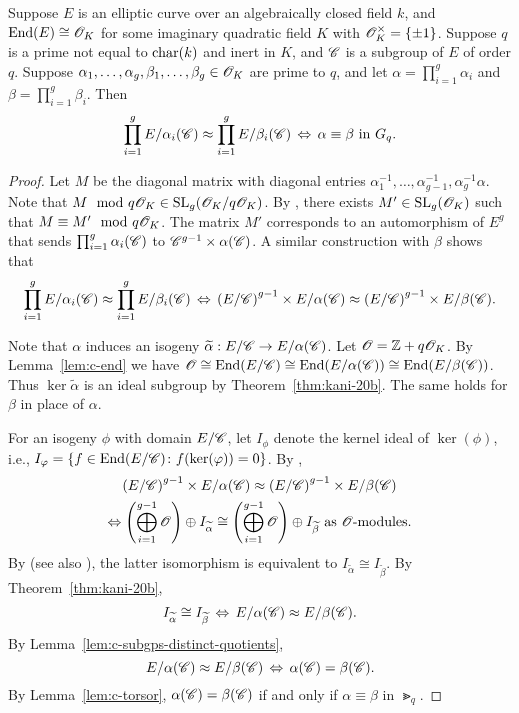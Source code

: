 \documentclass{amsart}
\begin{document}
\begin{proposition}\label{prop:prod-equiv-torsor}
  Suppose $E$ is an elliptic curve over an algebraically closed field $k$, and $\operatorname{End}(E) \cong \mathscr{O}_K$ for some imaginary quadratic field $K$ with $\mathscr{O}_K^\times = \{\pm 1\}$. Suppose $q$ is a prime not equal to $\operatorname{char}(k)$ and inert in $K$, and $\mathscr{C}$ is a subgroup of $E$ of order $q$. Suppose $\alpha_1,\dots,\alpha_g,\beta_1,\dots,\beta_g \in \mathscr{O}_K$ are prime to $q$, and let $\alpha = \prod_{i=1}^g\alpha_i$ and $\beta = \prod_{i=1}^g\beta_i$. Then
  \[
    \prod_{i=1}^g E/\alpha_i(\mathscr{C}) \approx \prod_{i=1}^g E/\beta_i(\mathscr{C})
    \,\Leftrightarrow\,
    \alpha \equiv \beta \text{ in } G_q.
  \]
\end{proposition}
\begin{proof}
   Let $M$ be the diagonal matrix with diagonal entries $\alpha_1^{-1},\dots,\alpha_{g-1}^{-1}, \alpha_g^{-1}\alpha$. Note that $M\mod{q\mathscr{O}_K} \in \operatorname{SL}_g(\mathscr{O}_K/q\mathscr{O}_K)$. By \cite[Cor.~5.2]{ktheory1964bass}, there exists $M' \in \operatorname{SL}_g(\mathscr{O}_K)$ such that $M \equiv M' \mod{q\mathscr{O}_K}$. The matrix $M'$ corresponds to an automorphism of $E^g$ that sends $\prod_{i=1}^g \alpha_i(\mathscr{C})$ to $\mathscr{C}^{g-1} \times \alpha(\mathscr{C})$. A similar construction with $\beta$ shows that
  \[
    \prod_{i=1}^g E/\alpha_i(\mathscr{C}) \approx \prod_{i=1}^g E/\beta_i(\mathscr{C})
    \,\Leftrightarrow\,
    \left(E/\mathscr{C}\right)^{g-1} \times E/\alpha(\mathscr{C}) \approx \left(E/\mathscr{C}\right)^{g-1} \times E/\beta(\mathscr{C}).
  \]

  Note that $\alpha$ induces an isogeny $\widetilde{\alpha}: E/\mathscr{C} \to E/\alpha(\mathscr{C})$. Let $\mathscr{O} = \mathbb{Z} + q\mathscr{O}_K$. By Lemma~\ref{lem:c-end} we have $\mathscr{O} \cong \operatorname{End}(E/\mathscr{C})\cong \operatorname{End}(E/\alpha(\mathscr{C}))\cong \operatorname{End}(E/\beta(\mathscr{C}))$. Thus $\ker\tilde{\alpha}$ is an ideal subgroup by Theorem~\ref{thm:kani-20b}. The same holds for $\beta$ in place of $\alpha$.

  For an isogeny $\phi$ with domain $E/\mathscr{C}$, let $I_\phi$ denote the kernel ideal of $\ker(\phi)$, i.e., $I_\varphi = \{f \in \operatorname{End}(E/\mathscr{C}) \colon f(\ker(\varphi)) = 0\}$.
  By \cite[Thm.~46]{kani2011products},
  \begin{multline*}
    \left(E/\mathscr{C}\right)^{g-1} \times E/\alpha(\mathscr{C}) \approx \left(E/\mathscr{C}\right)^{g-1} \times E/\beta(\mathscr{C})
    \\
    \Leftrightarrow
    \left(\bigoplus_{i=1}^{g-1} \mathscr{O}\right) \oplus I_{\widetilde{\alpha}} \cong \left(\bigoplus_{i=1}^{g-1} \mathscr{O}\right) \oplus I_{\widetilde{\beta}} \text{  as $\mathscr{O}$-modules}.
  \end{multline*}
By \cite[Thm.~48]{kani2011products} (see also \cite[Rem.~49b]{kani2011products}), the latter isomorphism is equivalent to $I_{\tilde{\alpha}} \cong I_{\tilde{\beta}}$.
  By Theorem~\ref{thm:kani-20b},
  \[
    I_{\widetilde{\alpha}} \cong I_{\widetilde{\beta}}
    \,\Leftrightarrow\,
    E/\alpha(\mathscr{C}) \approx E/\beta(\mathscr{C}).
  \]
  By Lemma~\ref{lem:c-subgps-distinct-quotients},
  \[
    E/\alpha(\mathscr{C}) \approx E/\beta(\mathscr{C})
    \,\Leftrightarrow\,
    \alpha(\mathscr{C}) = \beta(\mathscr{C}).
  \]
  By Lemma~\ref{lem:c-torsor}, $\alpha(\mathscr{C}) = \beta(\mathscr{C})$ if and only if $\alpha \equiv \beta$ in $\Gt_q$.
\end{proof}
\end{document}
